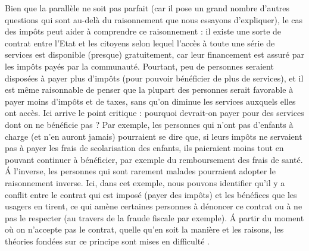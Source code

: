 \documentclass[
  12pt,
]{book}
\begin{document}
Bien que la parallèle ne soit pas parfait (car il pose un grand nombre d'autres questions qui sont au-delà du raisonnement que nous essayons d'expliquer), le cas des impôts peut aider à comprendre ce raisonnement : il existe une sorte de contrat entre l'Etat et les citoyens selon lequel l'accès à toute une série de services est disponible (presque) gratuitement, car leur financement est assuré par les impôts payés par la communauté. Pourtant, peu de personnes seraient disposées à payer plus d'impôts (pour pouvoir bénéficier de plus de services), et il est même raisonnable de penser que la plupart des personnes serait favorable à payer moins d'impôts et de taxes, sans qu'on diminue les services auxquels elles ont accès. Ici arrive le point critique : pourquoi devrait-on payer pour des services dont on ne bénéficie pas ? Par exemple, les personnes qui n'ont pas d'enfants à charge (et n'en auront jamais) pourraient se dire que, si leurs impôts ne servaient pas à payer les frais de scolarisation des enfants, ils paieraient moins tout en pouvant continuer à bénéficier, par exemple du remboursement des frais de santé. Á l'inverse, les personnes qui sont rarement malades pourraient adopter le raisonnement inverse. Ici, dans cet exemple, nous pouvons identifier qu'il y a conflit entre le contrat qui est imposé (payer des impôts) et les bénéfices que les usagers en tirent, ce qui amène certaines personnes à dénoncer ce contrat ou à ne pas le respecter (au travers de la fraude fiscale par exemple). Á partir du moment où on n'accepte pas le contrat, quelle qu'en soit la manière et les raisons, les théories fondées sur ce principe sont mises en difficulté \citep{Gauthier1990-GAUMDC-3}.
\end{document}

